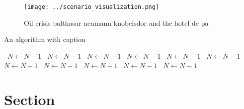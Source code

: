 \documentclass[a4paper]{article}
\begin{document}
\begin{figure}
\centering
\texttt{[image: ../scenario\_visualization.png]}
\caption{Oil crisis balthasar neumann knobelsdor and the hotel de pa
}
\end{figure}
 
\begin{algorithm}
\caption{An algorithm with caption}
\begin{algorithmic}
\    \State $N \gets N - 1$
\    \State $N \gets N - 1$
\    \State $N \gets N - 1$
\    \State $N \gets N - 1$
\    \State $N \gets N - 1$
\    \State $N \gets N - 1$
\    \State $N \gets N - 1$
\    \State $N \gets N - 1$
\    \State $N \gets N - 1$
\    \State $N \gets N - 1$
\    \State $N \gets N - 1$
\EndWhile
\end{algorithmic}
\end{algorithm}

\section{Section}
\end{document}
